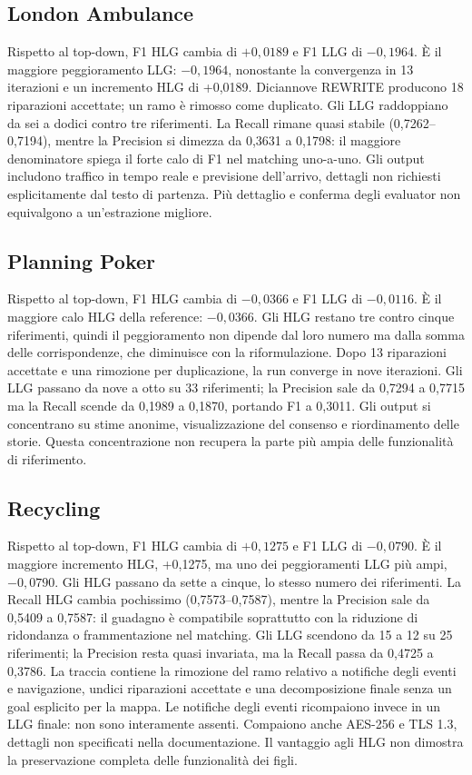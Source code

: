 \subsection{London Ambulance}
Rispetto al top-down, F1 HLG cambia di $+0,0189$ e F1 LLG di $-0,1964$. È il maggiore peggioramento LLG: $-0{,}1964$, nonostante la convergenza in 13 iterazioni e un incremento HLG di +0,0189. Diciannove REWRITE producono 18 riparazioni accettate; un ramo è rimosso come duplicato. Gli LLG raddoppiano da sei a dodici contro tre riferimenti. La Recall rimane quasi stabile (0,7262--0,7194), mentre la Precision si dimezza da 0,3631 a 0,1798: il maggiore denominatore spiega il forte calo di F1 nel matching uno-a-uno. Gli output includono traffico in tempo reale e previsione dell'arrivo, dettagli non richiesti esplicitamente dal testo di partenza. Più dettaglio e conferma degli evaluator non equivalgono a un'estrazione migliore.

\subsection{Planning Poker}
Rispetto al top-down, F1 HLG cambia di $-0,0366$ e F1 LLG di $-0,0116$. È il maggiore calo HLG della reference: $-0{,}0366$. Gli HLG restano tre contro cinque riferimenti, quindi il peggioramento non dipende dal loro numero ma dalla somma delle corrispondenze, che diminuisce con la riformulazione. Dopo 13 riparazioni accettate e una rimozione per duplicazione, la run converge in nove iterazioni. Gli LLG passano da nove a otto su 33 riferimenti; la Precision sale da 0,7294 a 0,7715 ma la Recall scende da 0,1989 a 0,1870, portando F1 a 0,3011. Gli output si concentrano su stime anonime, visualizzazione del consenso e riordinamento delle storie. Questa concentrazione non recupera la parte più ampia delle funzionalità di riferimento.

\subsection{Recycling}
Rispetto al top-down, F1 HLG cambia di $+0,1275$ e F1 LLG di $-0,0790$. È il maggiore incremento HLG, +0,1275, ma uno dei peggioramenti LLG più ampi, $-0{,}0790$. Gli HLG passano da sette a cinque, lo stesso numero dei riferimenti. La Recall HLG cambia pochissimo (0,7573--0,7587), mentre la Precision sale da 0,5409 a 0,7587: il guadagno è compatibile soprattutto con la riduzione di ridondanza o frammentazione nel matching. Gli LLG scendono da 15 a 12 su 25 riferimenti; la Precision resta quasi invariata, ma la Recall passa da 0,4725 a 0,3786. La traccia contiene la rimozione del ramo relativo a notifiche degli eventi e navigazione, undici riparazioni accettate e una decomposizione finale senza un goal esplicito per la mappa. Le notifiche degli eventi ricompaiono invece in un LLG finale: non sono interamente assenti. Compaiono anche AES-256 e TLS 1.3, dettagli non specificati nella documentazione. Il vantaggio agli HLG non dimostra la preservazione completa delle funzionalità dei figli.

